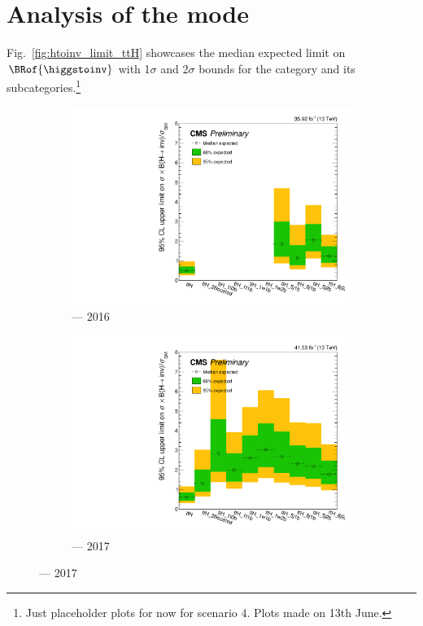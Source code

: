 

\section{Analysis of the \texorpdfstring{\ttH}{ttH} mode}
\label{sec:htoinv_analysis_ttH}


Fig.~\ref{fig:htoinv_limit_ttH} showcases the median expected limit on $\BRof{\higgstoinv}$ with 1$\sigma$ and 2$\sigma$ bounds for the \ttH category and its subcategories.\footnote{Just placeholder plots for now for scenario 4. Plots made on 13th June.}

\begin{figure}[htbp]
    \centering
    \begin{subfigure}[b]{0.45\textwidth}
        \includegraphics[width=\textwidth]{figures/limits/ttH/limit_2016_ttH_Scenario4.pdf}
        \caption{\ttH --- 2016}
    \end{subfigure}
    \hfill
    \begin{subfigure}[b]{0.45\textwidth}
        \includegraphics[width=\textwidth]{figures/limits/ttH/limit_2017_ttH_Scenario4.pdf}
        \caption{\ttH --- 2017}
    \end{subfigure}


\end{figure}

